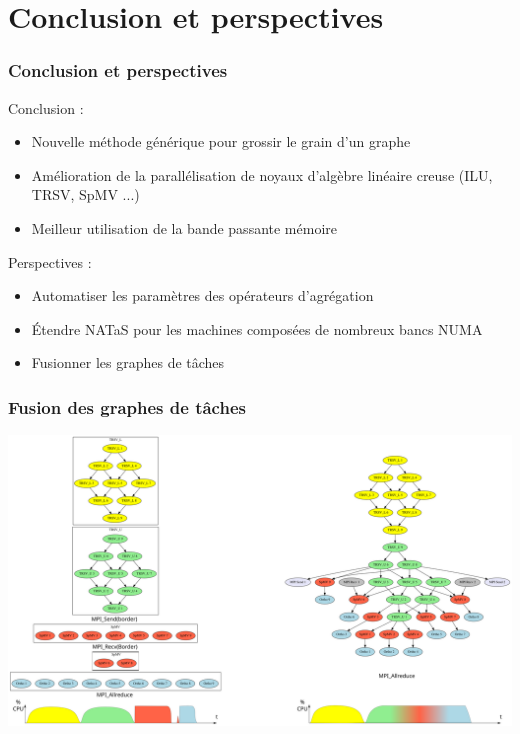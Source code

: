 \documentclass{beamer}
\begin{document}
\section{Conclusion et perspectives}
\begin{frame}
  \frametitle{Conclusion et perspectives}
         Conclusion :
    \begin{itemize}
      \item<1-> Nouvelle méthode générique pour grossir le grain d'un graphe
      \item<1-> Amélioration de la parallélisation de noyaux d'algèbre linéaire creuse (ILU, TRSV, SpMV ...)
      \item<1-> Meilleur utilisation de la bande passante mémoire
    \end{itemize}
    \pause

         \bigskip
         \bigskip

    Perspectives :
    \begin{itemize}
      \item<2-> Automatiser les paramètres des opérateurs d'agrégation
      \item<2-> \'Etendre NATaS pour les machines composées de nombreux bancs NUMA
      \item<2-> Fusionner les graphes de tâches
    \end{itemize}
\end{frame}


\begin{frame}
  \frametitle{Fusion des graphes de tâches}

  \centerline{\includegraphics[width=\linewidth]{fusion}}
\end{frame}
\end{document}
